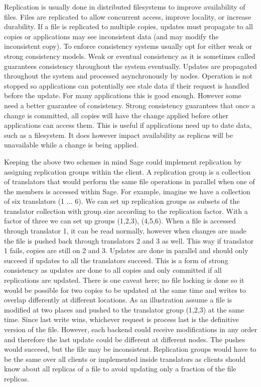 Replication is usually done in distributed filesystems to improve availability of files. Files are replicated to allow concurrent access,  improve locality, or increase durability. If a file is replicated to multiple copies, updates must propagate to all copies or applications may see inconsistent data (and may modify the inconsistent copy). To enforce consistency systems usually opt for either weak or strong consistency models. Weak or eventual consistency as it is sometimes called guarantees consistency throughout the system eventually. Updates are propagated throughout the system and processed asynchronously by nodes. Operation is not stopped so applications can potentially see stale data if their request is handled before the update. For many applications this is good enough. However some need a better guarantee of consistency. Strong consistency guarantees that once a change is committed, all copies will have the change applied before other applications can access them. This is useful if applications need up to date data, such as a filesystem. It does however impact availability as replicas will be unavailable while a change is being applied.

Keeping the above two schemes in mind Sage could implement replication by assigning replication groups within the client. A replication group is a collection of translators that would perform the same file operations in parallel when one of the members is accessed within Sage. For example, imagine we have a collection of six translators (1 $\dots$ 6). We can set up replication groups as subsets of the translator collection with group size according to the replication factor. With a factor of three we can set up groups (1,2,3), (4,5,6). When a file is accessed through translator 1, it can be read normally, however when changes are made the file is pushed back through translators 2 and 3 as well. This way if translator 1 fails, copies are still on 2 and 3. Updates are done in parallel and should only succeed if updates to all the translators succeed. This is a form of strong consistency as updates are done to all copies and only committed if all replications are updated. There is one caveat here; no file locking is done so it would be possible for two copies to be updated at the same time and writes to overlap differently at different locations. As an illustration assume a file is modified at two places and pushed to the translator group (1,2,3) at the same time. Since last write wins, whichever request is process last is the definitive version of the file. However, each backend could receive modifications in any order and therefore the last update could be different at different nodes. The pushes would succeed, but the file may be inconsistent. Replication groups would have to be the same over all clients or implemented inside translators as clients should know about all replicas of a file to avoid updating only a fraction of the file replicas.

